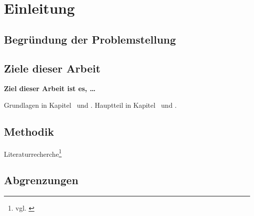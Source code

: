 \section{Einleitung} %
\label{sec:einleitung}

\subsection{Begründung der Problemstellung} %
\label{sub:begrundung_der_problemstellung}


\subsection{Ziele dieser Arbeit} %
\label{sub:ziele_dieser_arbeit}
\textbf{Ziel dieser Arbeit ist es, …}

Grundlagen in Kapitel~ und .
Hauptteil in Kapitel~ und .


\subsection{Methodik} %
\label{sub:methodik}

Literaturrecherche\footnote{vgl. \cite{learningjava}}


\subsection{Abgrenzungen} %
\label{sub:abgrenzungen}


